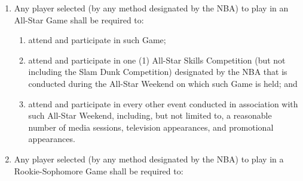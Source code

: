 \documentclass[
]{book}
\providecommand{\tightlist}{%
  \setlength{\itemsep}{0pt}\setlength{\parskip}{0pt}}
\begin{document}
\begin{enumerate}
\def\labelenumi{(\alph{enumi})}
\tightlist
\item
  Any player selected (by any method designated by the NBA) to play in an All-Star Game shall be required to:

  \begin{enumerate}
  \def\labelenumii{(\roman{enumii})}
  \tightlist
  \item
    attend and participate in such Game;
  \item
    attend and participate in one (1) All-Star Skills Competition (but not including the Slam Dunk Competition) designated by the NBA that is conducted during the All-Star Weekend on which such Game is held; and
  \item
    attend and participate in every other event conducted in association with such All-Star Weekend, including, but not limited to, a reasonable number of media sessions, television appearances, and promotional appearances.
  \end{enumerate}
\item
  Any player selected (by any method designated by the NBA) to play in a Rookie-Sophomore Game shall be required to:


\end{enumerate}
\end{document}
